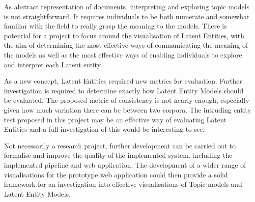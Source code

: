 \documentclass[10pt]{report}
\begin{document}
As abstract representation of documents, interpreting and exploring topic models is not straightforward. It requires individuals to be both numerate and somewhat familiar with the field to really grasp the meaning to the models. There is potential for a project to focus around the visualisation of Latent Entities, with the aim of determining the most effective ways of communicating the meaning of the models as well as the most effective ways of enabling individuals to explore and interpret each Latent entity.

As a new concept, Latent Entities required new metrics for evaluation. Further investigation is required to determine exactly how Latent Entity Models should be evaluated. The proposed metric of consistency is not nearly enough, especially given how much variation there can be between two corpora. The intruding entity test proposed in this project may be an effective way of evaluating Latent Entities and a full investigation of this would be interesting to see.

Not necessarily a research project, further development can be carried out to formalise and improve the quality of the implemented system, including the implemented pipeline and web application. The development of a wider range of visualisations for the prototype web application could then provide a solid framework for an investigation into effective visualisations of Topic models and Latent Entity Models.


\renewcommand{\baselinestretch}{1.0}\normalsize


\end{document}

